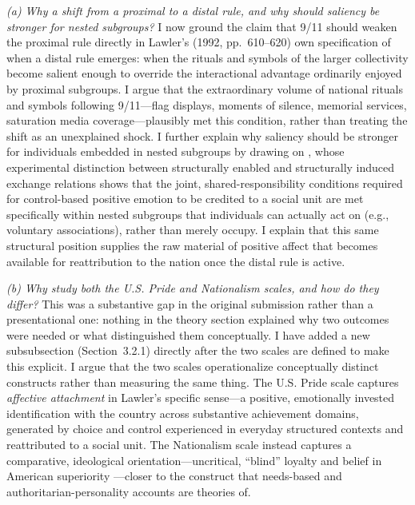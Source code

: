 \documentclass[11pt]{article}
\begin{document}
\textit{(a) Why a shift from a proximal to a distal rule, and why should saliency be stronger for nested subgroups?} I now ground the claim that 9/11 should weaken the proximal rule directly in Lawler's (1992, pp.~610--620) own specification of when a distal rule emerges: when the rituals and symbols of the larger collectivity become salient enough to override the interactional advantage ordinarily enjoyed by proximal subgroups. I argue that the extraordinary volume of national rituals and symbols following 9/11---flag displays, moments of silence, memorial services, saturation media coverage---plausibly met this condition, rather than treating the shift as an unexplained shock. I further explain why saliency should be stronger for individuals embedded in nested subgroups by drawing on \citet{lawler2006commitment-b3a}, whose experimental distinction between structurally enabled and structurally induced exchange relations shows that the joint, shared-responsibility conditions required for control-based positive emotion to be credited to a social unit are met specifically within nested subgroups that individuals can actually act on (e.g., voluntary associations), rather than merely occupy. I explain that this same structural position supplies the raw material of positive affect that becomes available for reattribution to the nation once the distal rule is active.

\textit{(b) Why study both the U.S. Pride and Nationalism scales, and how do they differ?} This was a substantive gap in the original submission rather than a presentational one: nothing in the theory section explained why two outcomes were needed or what distinguished them conceptually. I have added a new subsubsection (Section~3.2.1) directly after the two scales are defined to make this explicit. I argue that the two scales operationalize conceptually distinct constructs rather than measuring the same thing. The U.S. Pride scale captures \textit{affective attachment} in Lawler's specific sense---a positive, emotionally invested identification with the country across substantive achievement domains, generated by choice and control experienced in everyday structured contexts and reattributed to a social unit. The Nationalism scale instead captures a comparative, ideological orientation---uncritical, ``blind'' loyalty and belief in American superiority \citep{schatz1999varieties}---closer to the construct that needs-based and authoritarian-personality accounts are theories of.
\end{document}
